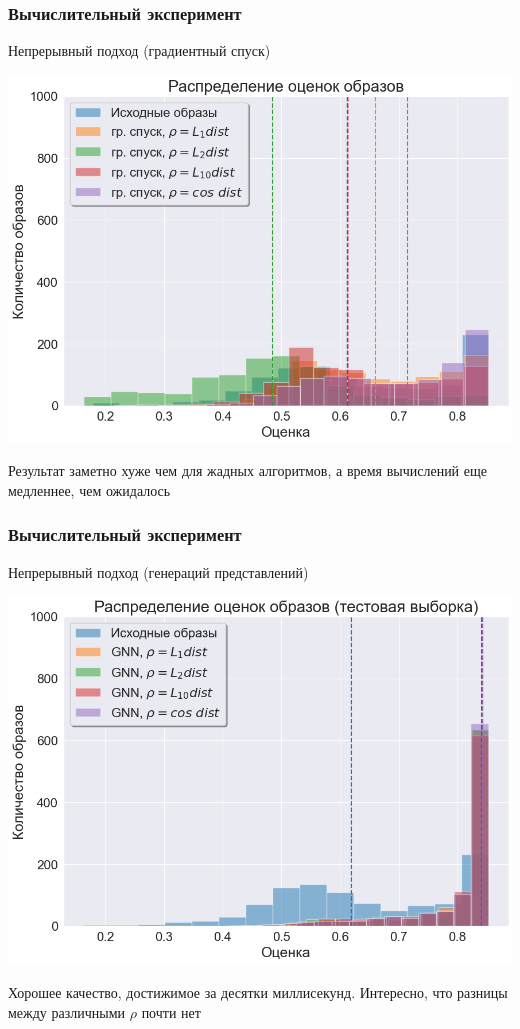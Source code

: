 \documentclass[10pt]{beamer}
\begin{document}
\begin{frame}
	\frametitle{Вычислительный эксперимент}
	\begin{block}{Непрерывный подход (градиентный спуск)}
		\vspace{-0.3cm}
		\begin{center}
			\includegraphics[scale = 0.47]{../figures/backprop_at_least_5_subset1000.png}
		\end{center}
	\end{block}
Результат заметно хуже чем для жадных алгоритмов, а время вычислений еще медленнее, чем ожидалось
\end{frame}

\begin{frame}
	\frametitle{Вычислительный эксперимент}
	\begin{block}{Непрерывный подход (генераций представлений)}
		\vspace{-0.3cm}
		\begin{center}
			\includegraphics[scale = 0.47]{../figures/GNN_at_least_5_subset1000_test.png}
		\end{center}
	\end{block}
	Хорошее качество, достижимое за десятки миллисекунд. Интересно, что разницы между различными $\rho$ почти нет
\end{frame}
\end{document}
